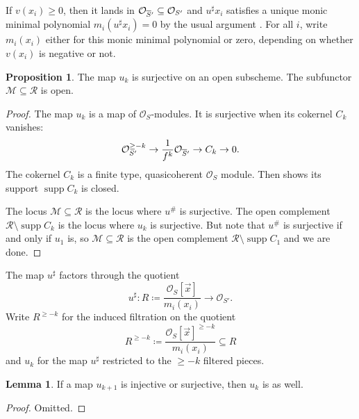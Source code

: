 \documentclass[11pt,reqno]{amsart}
\theoremstyle{definition}
\newtheorem{lemma}[theorem]{Lemma}
\newtheorem{proposition}[theorem]{Proposition}
\newcommand{\OO}{\mathcal{O}}
\def\supp{\operatorname{supp}}
\def\overnorm#1{\overline{#1}\vphantom{#1}}
\renewcommand{\bar}[1]{\ensuremath{\overnorm{#1}}}
\newcommand{\WR}{\cal R}
\newcommand{\Gen}{\cal M}
\newcommand{\cal}[1]{\ensuremath{\mathcal{#1}}}
\begin{document}
If $v(x_i) \geq 0$, then it lands in $\OO_{\bar S'} \subseteq \OO_{S'}$ and $u^\sharp x_i$ satisfies a unique monic minimal polynomial $m_i(u^\sharp x_i) = 0$ by the usual argument \cite{}. For all $i$, write $m_i(x_i)$ either for this monic minimal polynomial or zero, depending on whether $v(x_i)$ is negative or not. 



\begin{proposition}
	The map $u_k$ is surjective on an open subscheme. The subfunctor $\Gen \subseteq \WR$ is open. 
\end{proposition}


\begin{proof}
	The map $u_k$ is a map of $\OO_S$-modules. It is surjective when its cokernel $C_k$ vanishes: 
	\[
	\OO_{S'}^{\geq -k} \to \dfrac{1}{f^k} \OO_{\bar S'} \to C_k \to 0.	
	\]
	The cokernel $C_k$ is a finite type, quasicoherent $\OO_S$ module. Then \cite[056J]{stacks} shows its support $\supp C_k$ is closed. 
	
	The locus $\Gen \subseteq \WR$ is the locus where $u^\#$ is surjective. The open complement $\WR \setminus \supp C_k$ is the locus where $u_k$ is surjective. But note that $u^\#$ is surjective if and only if $u_1$ is, so $\Gen \subseteq \WR$ is the open complement $\WR \setminus \supp C_1$ and we are done. 
\end{proof}











The map $u^\sharp$ factors through the quotient
\[u^\sharp : R \coloneqq \dfrac{\OO_S[\vec x]}{m_i(x_i)} \to \OO_{S'}.\]
Write $R^{\geq -k}$ for the induced filtration on the quotient
\[R^{\geq -k} \coloneqq \dfrac{\OO_S[\vec x]^{\geq -k}}{m_i(x_i)} \subseteq R\]
and $u_k$ for the map $u^\sharp$ restricted to the $\geq -k$ filtered pieces. 


\begin{lemma}

If a map $u_{k+1}$ is injective or surjective, then $u_k$ is as well. 

\end{lemma}

\begin{proof}

Omitted. 

\end{proof}
\end{document}
